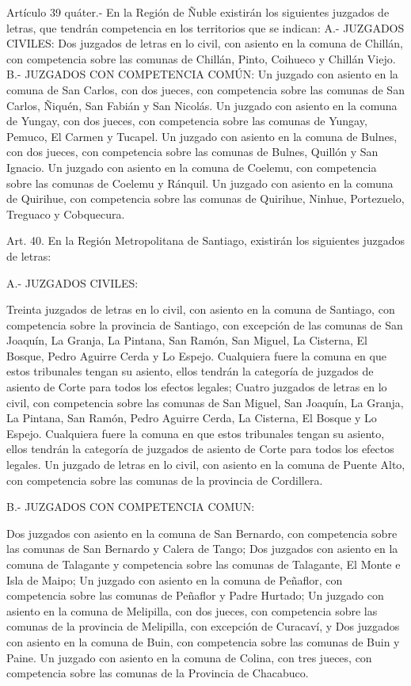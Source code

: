     Artículo 39 quáter.- En la Región de Ñuble existirán los siguientes juzgados de letras, que tendrán competencia en los territorios que se indican:
    A.- JUZGADOS CIVILES:
    Dos juzgados de letras en lo civil, con asiento en la comuna de Chillán, con competencia sobre las comunas de Chillán, Pinto, Coihueco y Chillán Viejo.
    B.- JUZGADOS CON COMPETENCIA COMÚN:
    Un juzgado con asiento en la comuna de San Carlos, con dos jueces, con competencia sobre las comunas de San Carlos, Ñiquén, San Fabián y San Nicolás.
    Un juzgado con asiento en la comuna de Yungay, con dos jueces, con competencia sobre las comunas de Yungay, Pemuco, El Carmen y Tucapel.
    Un juzgado con asiento en la comuna de Bulnes, con dos jueces, con competencia sobre las comunas de Bulnes, Quillón y San Ignacio.
    Un juzgado con asiento en la comuna de Coelemu, con competencia sobre las comunas de Coelemu y Ránquil.
    Un juzgado con asiento en la comuna de Quirihue, con competencia sobre las comunas de Quirihue, Ninhue, Portezuelo, Treguaco y Cobquecura.


    Art. 40. En la Región Metropolitana de Santiago, existirán los siguientes juzgados de letras:

    A.- JUZGADOS CIVILES:

    Treinta juzgados de letras en lo civil, con asiento en la comuna de Santiago, con competencia sobre la provincia de Santiago, con excepción de las comunas de San Joaquín, La Granja, La Pintana, San Ramón, San Miguel, La Cisterna, El Bosque, Pedro Aguirre Cerda y Lo Espejo. Cualquiera fuere la comuna en que estos tribunales tengan su asiento, ellos tendrán la categoría de juzgados de asiento de Corte para todos los efectos legales;
    Cuatro juzgados de letras en lo civil, con competencia sobre las comunas de San Miguel, San Joaquín, La Granja, La Pintana, San Ramón, Pedro Aguirre Cerda, La Cisterna, El Bosque y Lo Espejo. Cualquiera fuere la comuna en que estos tribunales tengan su asiento, ellos tendrán la categoría de juzgados de asiento de Corte para todos los efectos legales.
    Un juzgado de letras en lo civil, con asiento en la comuna de Puente Alto, con competencia sobre las comunas de la provincia de Cordillera.

    B.- JUZGADOS CON COMPETENCIA COMUN:

    Dos juzgados con asiento en la comuna de San Bernardo, con competencia sobre las comunas de San Bernardo y Calera de Tango;
    Dos juzgados con asiento en la comuna de Talagante y competencia sobre las comunas de Talagante, El Monte e Isla de Maipo;
    Un juzgado con asiento en la comuna de Peñaflor, con competencia sobre las comunas de Peñaflor y Padre Hurtado;
    Un juzgado con asiento en la comuna de Melipilla, con dos jueces, con competencia sobre las comunas de la provincia de Melipilla, con excepción de Curacaví, y
    Dos juzgados con asiento en la comuna de Buin, con competencia sobre las comunas de Buin y Paine.
    Un juzgado con asiento en la comuna de Colina, con tres jueces, con competencia sobre las comunas de la Provincia de Chacabuco.


